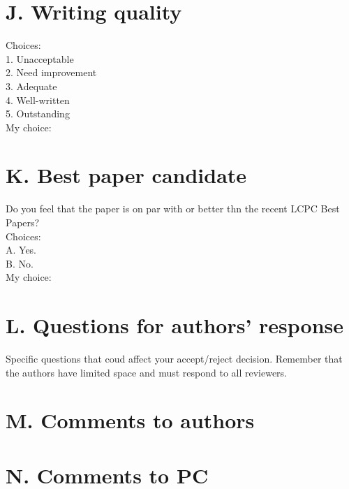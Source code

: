 \documentclass[]{ctexart}
\begin{document}
    \section{J. Writing quality}
    \noindent Choices:\\
    \hspace*{2em}1. Unacceptable\\
    \hspace*{2em}2. Need improvement\\
    \hspace*{2em}3. Adequate\\
    \hspace*{2em}4. Well-written\\
    \hspace*{2em}5. Outstanding\\
    My choice:
    \section{K. Best paper candidate}
    \noindent Do you feel that the paper is on par with or better thn the recent LCPC 
    Best Papers?\\
    Choices:\\
    \hspace*{2em}A. Yes.\\
    \hspace*{2em}B. No.\\
    My choice:
    \section{L. Questions for authors' response}
    Specific questions that coud affect your accept/reject decision. Remember that 
    the authors have limited space and must respond to all reviewers.
    \section{M. Comments to authors}
    \section{N. Comments to PC}
\end{document}
